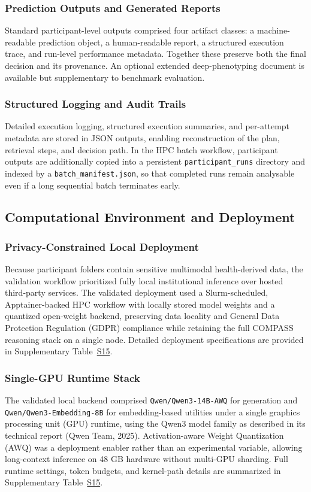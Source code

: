 \documentclass[11pt,a4paper,twoside]{article}
\begin{document}
\subsubsection{Prediction Outputs and Generated Reports}
Standard participant-level outputs comprised four artifact classes: a machine-readable prediction object, a human-readable report, a structured execution trace, and run-level performance metadata. Together these preserve both the final decision and its provenance. An optional extended deep-phenotyping document is available but supplementary to benchmark evaluation.

\subsubsection{Structured Logging and Audit Trails}
Detailed execution logging, structured execution summaries, and per-attempt metadata are stored in JSON outputs, enabling reconstruction of the plan, retrieval steps, and decision path. In the HPC batch workflow, participant outputs are additionally copied into a persistent \texttt{participant\_{\allowbreak}runs} directory and indexed by a \texttt{batch\_{\allowbreak}manifest.{\allowbreak}json}, so that completed runs remain analysable even if a long sequential batch terminates early.

\subsection{Computational Environment and Deployment}
\subsubsection{Privacy-Constrained Local Deployment}
Because participant folders contain sensitive multimodal health-derived data, the validation workflow prioritized fully local institutional inference over hosted third-party services. The validated deployment used a Slurm-scheduled, Apptainer-backed HPC workflow with locally stored model weights and a quantized open-weight backend, preserving data locality and General Data Protection Regulation (GDPR) compliance while retaining the full COMPASS reasoning stack on a single node. Detailed deployment specifications are provided in Supplementary Table~\hyperref[tab:s15]{S15}.

\subsubsection{Single-GPU Runtime Stack}
The validated local backend comprised \texttt{Qwen/{\allowbreak}Qwen3-14B-AWQ} for generation and \texttt{Qwen/{\allowbreak}Qwen3-Embedding-8B} for embedding-based utilities under a single graphics processing unit (GPU) runtime, using the Qwen3 model family as described in its technical report (Qwen Team, 2025). Activation-aware Weight Quantization (AWQ) was a deployment enabler rather than an experimental variable, allowing long-context inference on 48 GB hardware without multi-GPU sharding. Full runtime settings, token budgets, and kernel-path details are summarized in Supplementary Table~\hyperref[tab:s15]{S15}.
\end{document}
